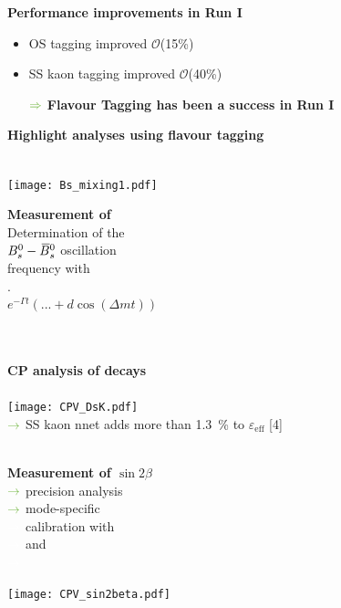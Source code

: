 {\begin{minipage}{0.474\boxwidth}
\begin{center}
\end{center}
\textbf{Performance improvements in Run I}
\begin{itemize}
\setlength\itemsep{0.01em}
\vspace{-0.3em}
\item OS tagging improved $\mathcal{O}$(15\%) 
\item SS kaon tagging improved $\mathcal{O}$(40\%)
\vspace{0.5em}
\setlength{\itemindent}{.14in}
\item[$\color{tu_gruen}\Rightarrow$] \textbf{Flavour Tagging has been a success in Run I}
\end{itemize}
\end{minipage}
\vspace{0.6em}
\hfill
\begin{minipage}{0.474\boxwidth}
\textbf{Highlight analyses using flavour tagging}\\
\vspace{-0.05em}\\
\parbox{0.474\textwidth}{\texttt{[image: Bs\_mixing1.pdf]}}
\hspace{2.15em}
\parbox{0.190\boxwidth}{\textbf{\vspace{0.4em}Measurement of \dms}\\Determination of the\\ $B^0_s-\kern 0.18em\overline{\kern -0.18em B}{}^0_s$ oscillation\\ frequency with\\ \BsToDspi [3].\vspace{0.5em}\\
				      $e^{-\Gamma t}\left(...+\!d\cos\left(\Delta mt\right)\right)$}\\
\vspace{0.25em}\\
\textbf{CP analysis of \BsToDsK decays}\\
\vspace{-0.35em}\\
\texttt{[image: CPV\_DsK.pdf]}\\
${\color{tu_gruen}\rightarrow}$ SS kaon nnet adds more than 1.3\, \% to $\varepsilon_\text{eff}$ [4]\\
\vspace{-0.35em}\\
\parbox[c]{0.197\boxwidth}{\textbf{\vspace{0.4em}Measurement of $\sin2\beta$}\\${\color{tu_gruen}\rightarrow}$ precision analysis\\${\color{tu_gruen}\rightarrow}$ mode-specific\\ ${\color{white}\rightarrow}$ calibration with\\${\color{white}\rightarrow}$ \BuToJPsiKp and\\${\color{white}\rightarrow}$ \BdToJPsiKst [5]}
\hspace{0.25em}
\parbox[c]{0.474\textwidth}{\texttt{[image: CPV\_sin2beta.pdf]}}
\end{minipage}
\vspace{-0.5em}
}

